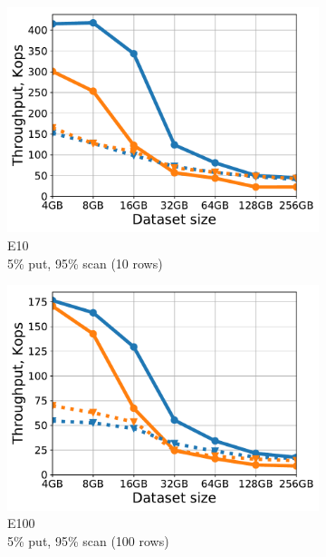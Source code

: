 \begin{figure}[tb]
\begin{subfigure}{0.32\linewidth}
\includegraphics[width=\textwidth]{figs/Workload_E-_line.pdf}
\caption{E10 \\ 5\% put, 95\% scan (10 rows)}
\label{fig:throughput:e10}
\end{subfigure}
\begin{subfigure}{0.32\linewidth}
\includegraphics[width=\textwidth]{figs/Workload_E_line.pdf}
\caption{E100 \\ 5\% put, 95\% scan (100 rows)}
\label{fig:throughput:e100}
\end{subfigure}
\begin{subfigure}{0.32\linewidth}

\end{subfigure}
\end{figure}
